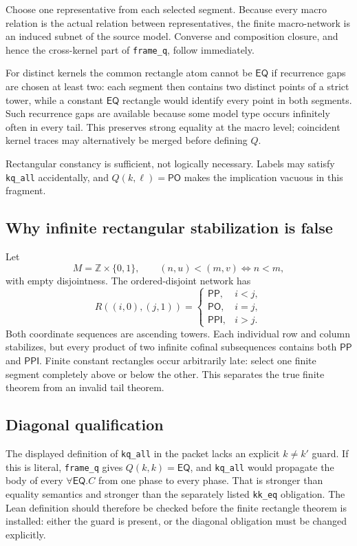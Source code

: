 \documentclass[11pt]{article}
\newcommand{\PP}{\mathsf{PP}}
\newcommand{\PPI}{\mathsf{PPI}}
\newcommand{\PO}{\mathsf{PO}}
\newcommand{\EQ}{\mathsf{EQ}}
\begin{document}
Choose one representative from each selected segment. Because every macro relation is the
actual relation between representatives, the finite macro-network is an induced subnet of
the source model. Converse and composition closure, and hence the cross-kernel part of
\texttt{frame\_q}, follow immediately.

For distinct kernels the common rectangle atom cannot be $\EQ$ if recurrence gaps are
chosen at least two: each segment then contains two distinct points of a strict tower, while
a constant $\EQ$ rectangle would identify every point in both segments. Such recurrence
gaps are available because some model type occurs infinitely often in every tail. This
preserves strong equality at the macro level; coincident kernel traces may alternatively be
merged before defining $Q$.

Rectangular constancy is sufficient, not logically necessary. Labels may satisfy
\texttt{kq\_all} accidentally, and $Q(k,\ell)=\PO$ makes the implication vacuous in this
fragment.

\subsection{Why infinite rectangular stabilization is false}

Let
\[
  M=\mathbb{Z}\times\{0,1\},\qquad
  (n,u)<(m,v)\Longleftrightarrow n<m,
\]
with empty disjointness. The ordered-disjoint network has
\[
R((i,0),(j,1))=
\begin{cases}
\PP,&i<j,\\
\PO,&i=j,\\
\PPI,&i>j.
\end{cases}
\]
Both coordinate sequences are ascending towers. Each individual row and column stabilizes,
but every product of two infinite cofinal subsequences contains both $\PP$ and $\PPI$.
Finite constant rectangles occur arbitrarily late: select one finite segment completely
above or below the other. This separates the true finite theorem from an invalid tail
theorem.

\subsection{Diagonal qualification}

The displayed definition of \texttt{kq\_all} in the packet lacks an explicit $k\neq k'$
guard. If this is literal, \texttt{frame\_q} gives $Q(k,k)=\EQ$, and \texttt{kq\_all} would
propagate the body of every $\forall\EQ.C$ from one phase to every phase. That is stronger
than equality semantics and stronger than the separately listed \texttt{kk\_eq}
obligation. The Lean definition should therefore be checked before the finite rectangle
theorem is installed: either the guard is present, or the diagonal obligation must be
changed explicitly.
\end{document}
